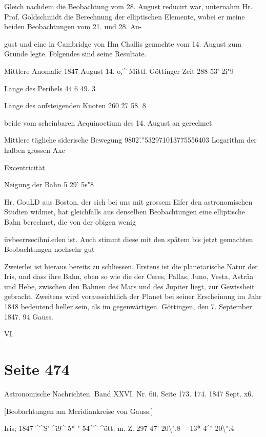 \documentclass[10pt,a4paper]{article}
\begin{document}
Gleich nachdem die Beobachtung vom 28. August reducirt war, unternahm Hr. Prof. Goldschmidt die Berechnung der elliptischen Elemente, wobei er meine beiden Beobachtungen vom 21. und 28. Au-

gust und eine in Cambridge von Hm Challis gemachte vom 14. August zum Grunde legte. Folgendes sind seine Resultate.

Mittlere Anomalie 1847 August 14. o,\textasciicircum{} Mittl. Göttinger Zeit 288\textdegree{} 53' 2i"9

Länge des Perihels 44 6 49. 3

Länge des aufsteigenden Knoten 260 27 58. 8

beide vom scheinbaren Aequinoctium des 14. August an gerechnet

Mittlere tägliche siderische Bewegung 9802\textdegree{}'."532971013775556403 Logarithm der halben grossen Axe

Excentricität

Neigung der Bahn 5\textdegree{} 29' 5s"8

Hr. GouLD aus Boston, der sich bei uns mit grossem Eifer den astronomischen Studien widmet, hat gleichfalls aus denselben Beobachtungen eine elliptische Bahn berechnet, die von der obigen wenig

üvbeerrsecihni.eden ist. Auch stimmt diese mit den spätem bis jetzt gemachten Beobachtungen noch\textdegree{}sehr gut

Zweierlei ist hieraus bereits zu schliessen. Erstens ist die planetarische Natur der Iris, und dass ihre Bahn, eben so wie die der Ceres, Pallas, Juno, Vesta, Asträa und Hebe, zwischen den Bahnen des Mars und des Jupiter liegt, zur Gewissheit gebracht. Zweitens wird voraussichtlich der Planet bei seiner Erscheinung im Jahr 1848 bedeutend heller sein, als im gegenwärtigen. Göttingen, den 7. September 1847. 94 Gauss.

VI.


\newpage
\section*{Seite 474}
Astronomische Nachrichten. Band XXVI. Nr. 6ii. Seite 173. 174. 1847 Sept. x6.

[Beobachtungen am Meridiankreise von Gauss.]

Iris; 1847 \textasciicircum{}\textasciicircum{}S' \textasciicircum{}i9\textasciicircum{} 5* " 54\textasciicircum{}\textasciicircum{} \textasciicircum{}ött. m. Z. 297\textdegree{} 47' 20\textbackslash{}".8 —13* 4\textasciicircum{}' 20\textbackslash{}".4
\end{document}
